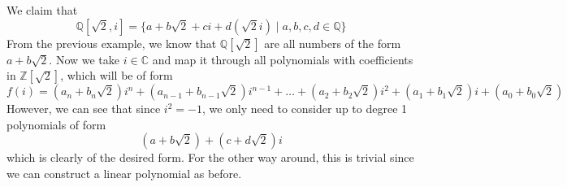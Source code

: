   \begin{example}
    \label{ex:extensions-of-sqrt2-and-i}
    We claim that 
    \begin{equation}
      \mathbb{Q}[\sqrt{2}, i] = \{ a + b \sqrt{2} + ci + d(\sqrt{2} i) \mid a, b, c, d \in \mathbb{Q}\}
    \end{equation}
    From the previous example, we know that $\mathbb{Q}[\sqrt{2}]$ are all numbers of the form $a + b\sqrt{2}$. Now we take $i \in \mathbb{C}$ and map it through all polynomials with coefficients in $\mathbb{Z}[\sqrt{2}]$, which will be of form 
    \begin{equation}
      f(i) = (a_n + b_n \sqrt{2}) i^n + (a_{n-1} + b_{n-1}\sqrt{2}) i^{n-1} + \ldots + (a_2 + b_2 \sqrt{2}) i^2 + (a_1 + b_1 \sqrt{2}) i + (a_0 + b_0 \sqrt{2})
    \end{equation} 
    However, we can see that since $i^2 = -1$, we only need to consider up to degree 1 polynomials of form 
    \begin{equation}
      (a + b \sqrt{2}) + (c + d \sqrt{2}) i 
    \end{equation}
    which is clearly of the desired form. For the other way around, this is trivial since we can construct a linear polynomial as before. 
  \end{example} 


